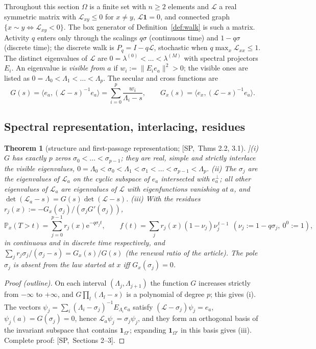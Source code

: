 \documentclass[10pt,a4paper]{article}
\theoremstyle{plain}
\newtheorem{theorem}{Theorem}[section]
\theoremstyle{definition}
\newcommand{\src}[2]{[\textsf{#1},~#2]}           %
\newcommand{\SPE}{\textsf{SP}}
\renewcommand{\P}{\mathbb{P}}
\newcommand{\Lg}{\mathcal{L}}
\newcommand{\ee}{\mathrm{e}}
\begin{document}
Throughout this section $\Omega$ is a finite set with $n\ge2$ elements and $\Lg$ a real symmetric matrix with $\Lg_{xy}\le0$ for $x\ne y$, $\Lg\mathbf 1=0$, and connected graph $\{x\sim y\iff \Lg_{xy}<0\}$. The box generator of Definition~\ref{def:walk} is such a matrix. Activity $q$ enters only through the scalings $q\sigma$ (continuous time) and $1-q\sigma$ (discrete time); the discrete walk is $P_q=I-q\Lg$, stochastic when $q\max_x\Lg_{xx}\le1$. The distinct eigenvalues of $\Lg$ are $0=\lambda^{(0)}<\dots<\lambda^{(M)}$ with spectral projectors $E_i$. An eigenvalue is \emph{visible from $a$} if $w_i:=\|E_ie_a\|^2>0$; the visible ones are listed as $0=\Lambda_0<\Lambda_1<\dots<\Lambda_p$. The secular and cross functions are
\[
G(s)=\langle e_a,(\Lg-s)^{-1}e_a\rangle=\sum_{i=0}^p\frac{w_i}{\Lambda_i-s},\qquad G_x(s)=\langle e_x,(\Lg-s)^{-1}e_a\rangle .
\]

\subsection{Spectral representation, interlacing, residues}

\begin{theorem}[structure and first-passage representation; \src{\SPE}{Thms 2.2, 3.1}]\label{thm:spec-rep}
(i) $G$ has exactly $p$ zeros $\sigma_0<\dots<\sigma_{p-1}$; they are real, simple and strictly interlace the visible eigenvalues, $0=\Lambda_0<\sigma_0<\Lambda_1<\sigma_1<\dots<\sigma_{p-1}<\Lambda_p$.
(ii) The $\sigma_j$ are the eigenvalues of $\Lg_a$ on the cyclic subspace of $e_a$ intersected with $e_a^\perp$; all other eigenvalues of $\Lg_a$ are eigenvalues of $\Lg$ with eigenfunctions vanishing at $a$, and $\det(\Lg_a-s)=G(s)\det(\Lg-s)$.
(iii) With the residues $r_j(x):=-G_x(\sigma_j)/(\sigma_jG'(\sigma_j))$,
\[
\P_x(T>t)=\sum_{j=0}^{p-1}r_j(x)\ee^{-q\sigma_jt},\qquad f(t)=\sum_jr_j(x)(1-\nu_j)\nu_j^{\,t-1}\ \ (\nu_j:=1-q\sigma_j,\ 0^0:=1),
\]
in continuous and in discrete time respectively, and $\sum_jr_j\sigma_j/(\sigma_j-s)=G_x(s)/G(s)$ (the renewal ratio of the article). The pole $\sigma_j$ is absent from the law started at $x$ iff $G_x(\sigma_j)=0$.
\end{theorem}
\begin{proof}[Proof (outline)]
On each interval $(\Lambda_j,\Lambda_{j+1})$ the function $G$ increases strictly from $-\infty$ to $+\infty$, and $G\prod_l(\Lambda_l-s)$ is a polynomial of degree $p$; this gives (i). The vectors $\psi_j=\sum_{i}(\Lambda_i-\sigma_j)^{-1}E_{\Lambda_i}e_a$ satisfy $(\Lg-\sigma_j)\psi_j=e_a$, $\psi_j(a)=G(\sigma_j)=0$, hence $\Lg_a\psi_j=\sigma_j\psi_j$, and they form an orthogonal basis of the invariant subspace that contains $\mathbf 1_{\Omega'}$; expanding $\mathbf 1_{\Omega'}$ in this basis gives (iii). Complete proof: \src{\SPE}{Sections 2--3}.
\end{proof}
\end{document}

